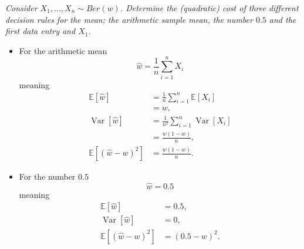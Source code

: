 \begin{example}
	\emph{Consider $X_1,\dots, X_n\sim Ber(w)$. Determine the (quadratic) cost of three different decision rules for the mean; the arithmetic sample mean, the number $0.5$ and the first data entry and $X_1$.}\newline
	
	\begin{itemize}
		\item For the arithmetic mean
		\begin{equation}
			\hat{w}=\frac{1}{n}\sum_{i=1}^nX_i
		\end{equation}
		meaning
		\begin{equation}
			\begin{split}
				\mathbb{E}[\hat{w}] & = \frac{1}{n}\sum_{i=1}^n\mathbb{E}[X_i]\\
				&=w,\\
				\operatorname{Var}[\hat{w}]	&= \frac{1}{n^2}\sum_{i=1}^n\operatorname{Var}[X_i]\\
				& = \frac{w(1-w)}{n},\\
				\mathbb{E}[(\hat{w}-w)^2]&=\frac{w(1-w)}{n}.
			\end{split} 
		\end{equation}

		\item For the number $0.5$ 
		\begin{equation}
			\hat{w}=0.5
		\end{equation}
		meaning
		\begin{equation}
			\begin{split}
				\mathbb{E}[\hat{w}] & = 0.5,\\
				\operatorname{Var}[\hat{w}]	&= 0,\\
				\mathbb{E}[(\hat{w}-w)^2]&=(0.5-w)^2.
			\end{split} 
		\end{equation}
		

\end{itemize}
\end{example}
